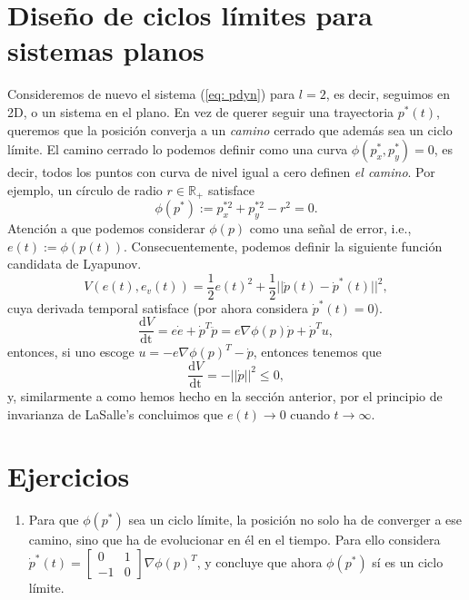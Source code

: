 	\section{Diseño de ciclos límites para sistemas planos}
	Consideremos de nuevo el sistema (\ref{eq: pdyn}) para $l=2$, es decir, seguimos en 2D, o un sistema en el plano. En vez de querer seguir una trayectoria $p^*(t)$, queremos que la posición converja a un \emph{camino} cerrado que además sea un ciclo límite. El camino cerrado lo podemos definir como una curva $\phi(p^*_x, p^*_y) = 0$, es decir, todos los puntos con curva de nivel igual a cero definen \emph{el camino}. Por ejemplo, un círculo de radio $r\in\mathbb{R}_+$ 
 satisface
	\begin{equation}
	\phi(p^*) := p_x^{*2} + p_y^{*2} - r^2 = 0.
	\end{equation}
Atención a que podemos considerar $\phi(p)$ como una señal de error, i.e., $e(t) := \phi(p(t))$. Consecuentemente, podemos definir la siguiente función candidata de Lyapunov.
\begin{equation}
	V(e(t),e_v(t)) = \frac{1}{2}e(t)^2 + \frac{1}{2}||\dot p(t) - \dot p^*(t)||^2,
	\label{eq: Ve2}
\end{equation}
	cuya derivada temporal satisface (por ahora considera $\dot p^*(t) = 0$).
	\begin{equation}
		\frac{\mathrm{d}V}{\mathrm{dt}} = e\dot e + \dot p^T\ddot p = e \nabla\phi(p) \dot p + \dot p^T u,
	\end{equation}
	entonces, si uno escoge $u = -e \nabla\phi(p)^T -\dot p$, entonces tenemos que
	\begin{equation}
\frac{\mathrm{d}V}{\mathrm{dt}} = -||\dot p||^2 \leq 0,
	\end{equation}
y, similarmente a como hemos hecho en la sección anterior, por el principio de invarianza de LaSalle's concluimos que $e(t) \to 0$ cuando $t\to\infty$.

\section*{Ejercicios}
\begin{enumerate}
\item Para que $\phi(p^*)$ sea un ciclo límite, la posición no solo ha de converger a ese camino, sino que ha de evolucionar en él en el tiempo. Para ello considera $\dot p^*(t) = \begin{bmatrix}0 & 1 \\ -1 & 0\end{bmatrix}\nabla\phi(p)^T$, y concluye que ahora $\phi(p^*)$ sí es un ciclo límite.
\end{enumerate}

